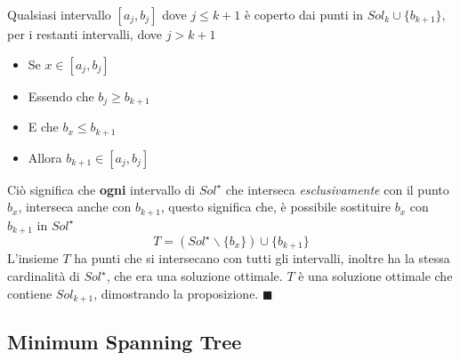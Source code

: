 \documentclass[12pt, letterpaper]{article}
\begin{document}
Qualsiasi intervallo $[a_j,b_j]$ dove $j\le k+1$ è coperto dai punti in $Sol_k\cup\{b_{k+1}\}$, per i restanti intervalli,
dove $j>k+1$\begin{itemize}
    \item Se $x\in [a_j,b_j]$
    \item Essendo che $b_j\ge b_{k+1}$
    \item E che $b_x \le b_{k+1}$
    \item Allora $b_{k+1}\in [a_j,b_j]$
\end{itemize}
Ciò significa che \textbf{ogni} intervallo di $Sol^\star$ che interseca \textit{esclusivamente} con il punto $b_x$, interseca
anche con $b_{k+1}$, questo significa che, è possibile sostituire $b_x$ con $b_{k+1}$ in $Sol^\star$
$$ T=(Sol^\star \backslash \{b_x\})\cup \{b_{k+1}\}$$
L'insieme $T$ ha punti che si intersecano con tutti gli intervalli, inoltre ha la stessa cardinalità di $Sol^\star$, che era una
soluzione ottimale. $T$ è una soluzione ottimale che contiene $Sol_{k+1}$, dimostrando la proposizione. $\blacksquare$

\subsection{Minimum Spanning Tree}
\end{document}
